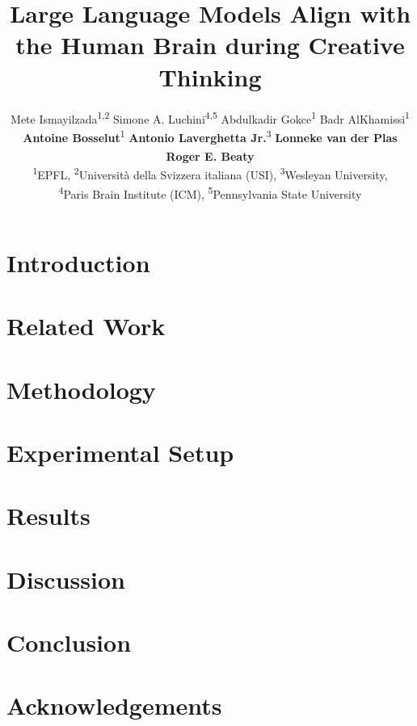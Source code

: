 \documentclass{article} %
\title{Large Language Models Align with the Human Brain during Creative Thinking}
\author{Mete Ismayilzada\textsuperscript{1,2} 
\authsep Simone A. Luchini\textsuperscript{4,5}
\authsep Abdulkadir Gokce\textsuperscript{1} 
\authsep Badr AlKhamissi\textsuperscript{1} \\
\textbf{Antoine Bosselut}\textsuperscript{1} 
\authsep \textbf{Antonio Laverghetta Jr.}\textsuperscript{3} 
\authsep \textbf{Lonneke van der Plas}\textsuperscript{\textdagger2} \\
\textbf{Roger E. Beaty}\textsuperscript{\textdagger5} \\
\textsuperscript{1}EPFL, 
\textsuperscript{2}Università della Svizzera italiana (USI), 
\textsuperscript{3}Wesleyan University,\\
\textsuperscript{4}Paris Brain Institute (ICM),
\textsuperscript{5}Pennsylvania State University
}
\begin{document}
\ifcolmsubmission
\linenumbers
\fi

\maketitle

\begin{abstract}

\end{abstract}

\section{Introduction}


\section{Related Work}


\section{Methodology}


\section{Experimental Setup}


\section{Results}


\section{Discussion}


\section*{Conclusion}


% 

% 

\section*{Acknowledgements}





\newpage
\appendix


\end{document}
